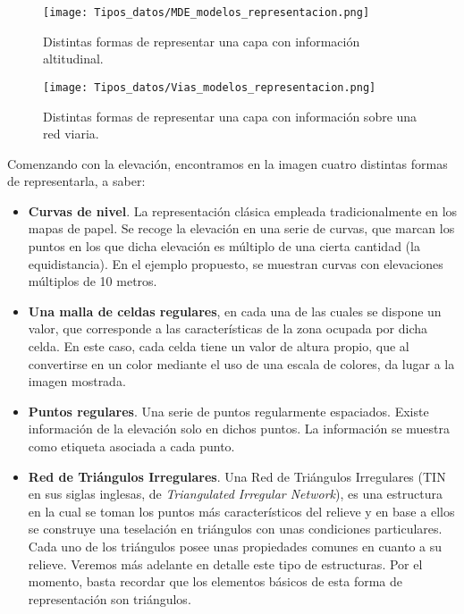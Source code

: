 \begin{multicols}{2}

\begin{figure*}[!ht]   
\centering
\texttt{[image: Tipos\_datos/MDE\_modelos\_representacion.png]}
\caption{\small Distintas formas de representar una capa con información altitudinal.}
\label{Fig:MDE_modelos_representacion} 
\end{figure*}

\begin{figure*}[t]   
\centering
\texttt{[image: Tipos\_datos/Vias\_modelos\_representacion.png]}
\caption{\small Distintas formas de representar una capa con información sobre una red viaria.}
\label{Fig:Vias_modelos_representacion} 
\end{figure*}

Comenzando con la elevación, encontramos en la imagen cuatro distintas formas de representarla, a saber:

\begin{itemize}
 \item \textbf{Curvas de nivel}. La representación clásica empleada tradicionalmente en los mapas de papel. Se recoge la elevación en una serie de curvas, que marcan los puntos en los que dicha elevación es múltiplo de una cierta cantidad (la equidistancia). En el ejemplo propuesto, se muestran curvas con elevaciones múltiplos de 10 metros.
\item \textbf{Una malla de celdas regulares}, en cada una de las cuales se dispone un valor, que corresponde a las características de la zona ocupada por dicha celda. En este caso, cada celda tiene un valor de altura propio, que al convertirse en un color mediante el uso de una escala de colores, da lugar a la imagen mostrada.
\item \textbf{Puntos regulares}. Una serie de puntos regularmente espaciados. Existe información de la elevación solo en dichos puntos. La información se muestra como etiqueta asociada a cada punto.
\item \textbf{Red de Triángulos Irregulares}. Una Red de Triángulos Irregulares (TIN en sus siglas inglesas, de \emph{Triangulated Irregular Network}), es una estructura en la cual se toman los puntos más característicos del relieve y en base a ellos se construye una teselación en triángulos con unas condiciones particulares. Cada uno de los triángulos posee unas propiedades comunes en cuanto a su relieve. Veremos más adelante en detalle este tipo de estructuras. Por el momento, basta recordar que los elementos básicos de esta forma de representación son triángulos.
\end{itemize}


\end{multicols}

